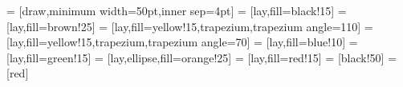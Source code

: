  = [draw,minimum width=50pt,inner sep=4pt]
 = [lay,fill=black!15]
 = [lay,fill=brown!25]
 = [lay,fill=yellow!15,trapezium,trapezium angle=110]
 = [lay,fill=yellow!15,trapezium,trapezium angle=70]
 = [lay,fill=blue!10]
 = [lay,fill=green!15]
 = [lay,ellipse,fill=orange!25]
 = [lay,fill=red!15]
 = [black!50]
 = [red]
